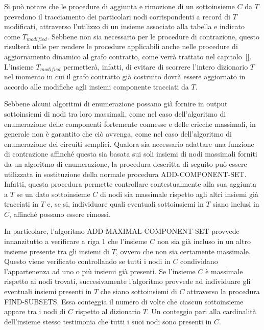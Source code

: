 

Si pu\`o notare che le procedure di aggiunta e rimozione di un sottoinsieme $C$ da $T$ prevedono il tracciamento
dei particolari nodi corrispondenti a record di $T$ modificati, attraverso l'utilizzo di un insieme associato
alla tabella e indicato come $T_{modified}$.
Sebbene non sia necessario per le procedure di contrazione, questo risulterà utile per rendere le procedure
applicabili anche nelle procedure di aggiornamento dinamico al grafo contratto, come verrà trattato nel capitolo~\ref{}.
L'insieme $T_{modified}$ permetterà, infatti, di evitare di scorrere l'intero dizionario $T$ nel momento in cui il
grafo contratto già costruito dovrà essere aggiornato in accordo alle modifiche agli insiemi componente tracciati
da $T$.


Sebbene alcuni algoritmi di enumerazione possano già fornire in output sottoinsiemi di nodi tra loro massimali,
come nel caso dell'algoritmo di enumerazione delle componenti fortemente connesse e delle cricche massimali,
in generale non è garantito che ciò avvenga, come nel caso dell'algoritmo di enumerazione dei circuiti semplici.
Qualora sia necessario adattare una funzione di contrazione affinché questa sia basata sui soli insiemi di nodi
massimali forniti da un algoritmo di enumerazione, la procedura descritta di seguito può essere utilizzata in
sostituzione della normale procedura ADD-COMPONENT-SET.
Infatti, questa procedura permette controllare contestualmente alla sua aggiunta a $T$ se un dato sottoinsieme $C$ di
nodi sia massimale rispetto agli altri insiemi già tracciati in $T$ e, se si, individuare quali eventuali sottoinsiemi
in $T$ siano inclusi in $C$, affinché possano essere rimossi.




In particolare, l'algoritmo ADD-MAXIMAL-COMPONENT-SET provvede innanzitutto a verificare a riga 1 che l'insieme $C$ non
sia gi\`a incluso in un altro insieme presente tra gli insiemi di $T$, ovvero che non sia certamente
massimale.
Questo viene verificato controllando se tutti i nodi in $C$ condividano l'appartenenza ad uno o pi\`u insiemi gi\`a
presenti. \newline
Se l'insieme $C$ \`e massimale rispetto ai nodi trovati, succesivamente l'algoritmo provvede ad individuare
gli eventuali insiemi presenti in $T$ che siano sottoinsiemi di $C$ attraverso la procedura FIND-SUBSETS.
Essa conteggia il numero di volte che ciascun sottoinsieme appare tra i nodi di $C$ rispetto al dizionario $T$.
Un conteggio pari alla cardinalit\`a dell'insieme stesso testimonia che tutti i suoi nodi sono presenti in $C$.

